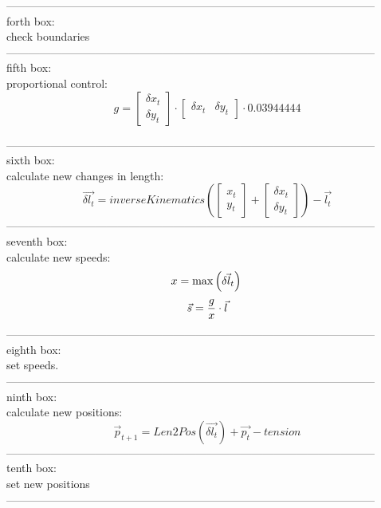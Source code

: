 \documentclass{article}
\begin{document}
---------------------------------------------------------------------------------------------------\\
forth box:\\
check boundaries\\
---------------------------------------------------------------------------------------------------\\
fifth box:\\
proportional control:\\
 \[
 g = 
 \begin{bmatrix}
 \delta{x_t}\\
 \delta{y_t}
 \end{bmatrix}
 \cdot
 \begin{bmatrix}
 \delta{x_t} & \delta{y_t}
 \end{bmatrix}
 \cdot 
 0.03944444
 \]

---------------------------------------------------------------------------------------------------\\
sixth box:\\
calculate new changes in length:\\
	\[
	\vec{\delta{l_t}} = inverseKinematics \left(
	\begin{bmatrix}
	x_t\\
	y_t
	\end{bmatrix}
	+ 
	\begin{bmatrix}
	\delta{x_t}\\
	\delta{y_t}
	\end{bmatrix}
	\right)
	- \vec{l_t}
	\]
---------------------------------------------------------------------------------------------------\\
\newpage
seventh box:\\
calculate new speeds:\\
	
\[
x = \max\left(\vec{\delta{l_t}}\right)\\\\
\]\[
\vec{s} = \frac{g}{x}\cdot \vec{l}\\	
\]
---------------------------------------------------------------------------------------------------\\
eighth box:\\
set speeds.\\
---------------------------------------------------------------------------------------------------\\
ninth box:\\
calculate new positions:\\
\[
\vec{p}_{t+1} = Len2Pos \left(
\vec{\delta{l_t}}
\right)
+ \vec{p_t} - tension
\]
---------------------------------------------------------------------------------------------------\\
tenth box:\\
set new positions\\
---------------------------------------------------------------------------------------------------\\
\end{document}
